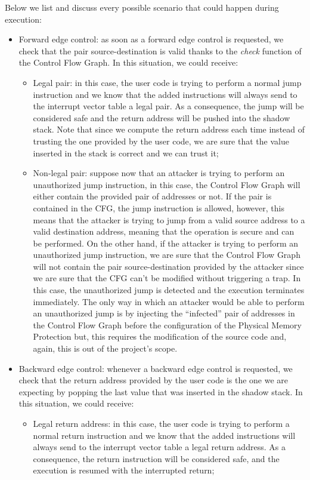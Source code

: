 Below we list and discuss every possible scenario that could happen during
execution:
\begin{itemize}
  \item Forward edge control: as soon as a forward edge control is requested, we
    check that the pair source-destination is valid thanks to the \textit{check}
    function of the Control Flow Graph. In this situation, we could receive:
    \begin{itemize}
      \item Legal pair: in this case, the user code is trying to perform a normal
        jump instruction and we know that the added instructions will always send
        to the interrupt vector table a legal pair. As a consequence, the jump will
        be considered safe and the return address will be pushed into the shadow
        stack. Note that since we compute the return address each time instead
        of trusting the one provided by the user code, we are sure that the value
        inserted in the stack is correct and we can trust it;

      \item Non-legal pair: suppose now that an attacker is trying to perform an
        unauthorized jump instruction, in this case, the Control Flow Graph will
        either contain the provided pair of addresses or not. If the pair is contained
        in the CFG, the jump instruction is allowed, however, this means that
        the attacker is trying to jump from a valid source address to a valid
        destination address, meaning that the operation is secure and can be performed.
        On the other hand, if the attacker is trying to perform an unauthorized jump
        instruction, we are sure that the Control Flow Graph will not contain
        the pair source-destination provided by the attacker since we are sure
        that the CFG can't be modified without triggering a trap. In this case,
        the unauthorized jump is detected and the execution terminates
        immediately. The only way in which an attacker would be able to perform an
        unauthorized jump is by injecting the ``infected'' pair of addresses in the
        Control Flow Graph before the configuration of the Physical Memory Protection
        but, this requires the modification of the source code and, again, this
        is out of the project's scope.
    \end{itemize}

  \item Backward edge control: whenever a backward edge control is requested, we
    check that the return address provided by the user code is the one we are expecting
    by popping the last value that was inserted in the shadow stack. In this
    situation, we could receive:
    \begin{itemize}
      \item Legal return address: in this case, the user code is trying to perform
        a normal return instruction and we know that the added instructions will
        always send to the interrupt vector table a legal return address. As a
        consequence, the return instruction will be considered safe, and the
        execution is resumed with the interrupted return;


\end{itemize}
\end{itemize}
